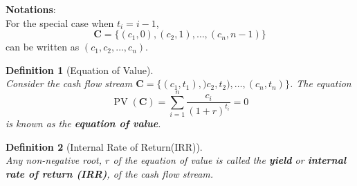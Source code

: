 \documentclass[12pt]{article}
\newtheorem{definition}{Definition}[section]
\theoremstyle{definition}
\DeclareMathOperator{\PV}{PV}
\newcommand\cf[1]{\mathbf{#1}}
\begin{document}
\textbf{Notations}:\\
For the special case when $t_i = i-1$,
\[
\cf{C}=\{(c_1,0),(c_2,1),\ldots,(c_n,n-1)\}
\]
can be written as $(c_1,c_2,\ldots, c_n)$.
\begin{definition}[Equation of Value]
\hfill\\\normalfont Consider the cash flow stream $\cf{C}=\{(c_1,t_1),)c_2,t_2),\ldots,(c_n,t_n)\}$. The equation
\[
\PV(\cf{C})=\sum_{i=1}^n\frac{c_i}{(1+r)^{t_i}} = 0
\]
is known as the \textbf{equation of value}.
\end{definition}
\begin{definition}[Internal Rate of Return(IRR)]
\hfill\\\normalfont Any non-negative root, $r$ of the equation of value is called the \textbf{yield} or \textbf{internal rate of return (IRR)}, of the cash flow stream.
\end{definition}
\end{document}
